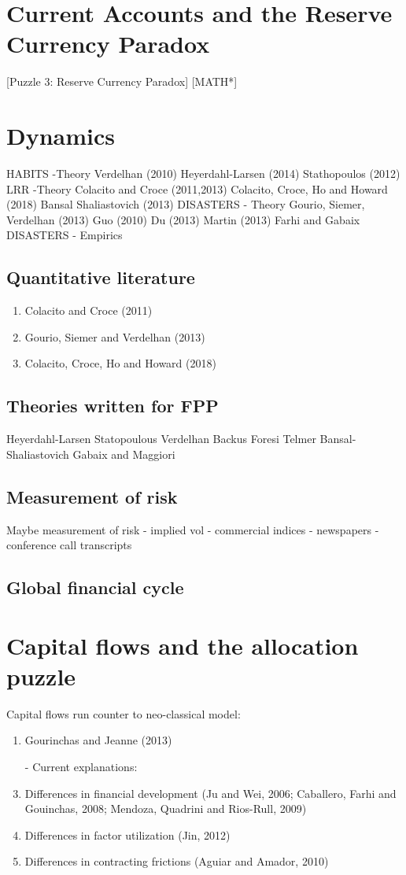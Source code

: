 \documentclass{ar-1col}
\begin{document}
\section{Current Accounts and the Reserve Currency Paradox}
 [Puzzle 3: Reserve Currency Paradox]
 [MATH*]

\section{Dynamics}

HABITS -Theory
Verdelhan (2010)
Heyerdahl-Larsen (2014)
Stathopoulos (2012)
LRR -Theory
Colacito and Croce (2011,2013)
Colacito, Croce, Ho and Howard (2018)
Bansal Shaliastovich (2013)
DISASTERS - Theory
Gourio, Siemer, Verdelhan (2013)
Guo (2010)
Du (2013)
Martin (2013)
Farhi and Gabaix
DISASTERS - Empirics


\subsection{Quantitative literature}
\begin{enumerate}
\item Colacito and Croce (2011)
\item Gourio, Siemer and Verdelhan (2013)
\item Colacito, Croce, Ho and Howard (2018)
\end{enumerate}
\subsection{Theories written for FPP}
Heyerdahl-Larsen Statopoulous Verdelhan Backus Foresi Telmer 
Bansal-Shaliastovich
Gabaix and Maggiori
\subsection{Measurement of risk}
Maybe measurement of risk - implied vol - commercial indices -
newspapers - conference call transcripts
\subsection{Global financial cycle}

\section{Capital flows and the allocation puzzle}
Capital flows run counter to neo-classical model:
\begin{enumerate}
\item Gourinchas and Jeanne (2013)
\item[-] Current explanations:
\item Differences in financial development (Ju and Wei, 2006;
  Caballero, Farhi and Gouinchas, 2008; Mendoza, Quadrini and
  Rios-Rull, 2009)
\item Differences in factor utilization (Jin, 2012)
\item Differences in contracting frictions (Aguiar and Amador, 2010)
\end{enumerate}
\end{document}
